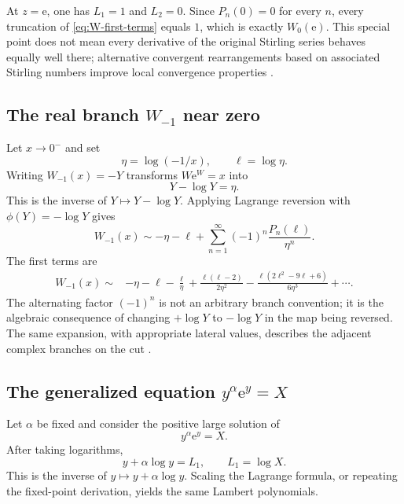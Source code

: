 \documentclass[11pt]{article}
\theoremstyle{pltheorem}
\newcommand{\e}{\mathrm e}
\begin{document}
At \(z=\e\), one has \(L_1=1\) and \(L_2=0\).  Since
\(P_n(0)=0\) for every \(n\), every truncation of
\cref{eq:W-first-terms} equals \(1\), which is exactly
\(W_0(\e)\).  This special point does not mean every derivative of the original Stirling series behaves equally well there; alternative convergent rearrangements based on associated Stirling numbers improve local convergence properties \cite{jeffrey-et-al-1995}.

\subsection{\texorpdfstring{The real branch \(W_{-1}\) near zero}{The real branch W-1 near zero}}

Let \(x\to0^-\) and set
\begin{equation}\label{eq:eta-def}
 \eta=\log(-1/x),
 \qquad
 \ell=\log\eta.
\end{equation}
Writing \(W_{-1}(x)=-Y\) transforms
\(W\e^W=x\) into
\begin{equation}\label{eq:Y-minus-logY}
 Y-\log Y=\eta.
\end{equation}
This is the inverse of \(Y\mapsto Y-\log Y\).  Applying Lagrange reversion with \(\phi(Y)=-\log Y\) gives
\begin{equation}\label{eq:Wminus1-expansion}
 \boxed{\quad
 W_{-1}(x)\sim-\eta-\ell
 +\sum_{n=1}^{\infty}(-1)^n\frac{P_n(\ell)}{\eta^n}.
 \quad}
\end{equation}
The first terms are
\begin{align}
 W_{-1}(x)\sim{}&-\eta-\ell-\frac{\ell}{\eta}
 +\frac{\ell(\ell-2)}{2\eta^2}
 -\frac{\ell(2\ell^2-9\ell+6)}{6\eta^3}
 +\cdots.
 \label{eq:Wminus1-first}
\end{align}
The alternating factor \((-1)^n\) is not an arbitrary branch convention; it is the algebraic consequence of changing \(+\log Y\) to \(-\log Y\) in the map being reversed.  The same expansion, with appropriate lateral values, describes the adjacent complex branches on the cut \cite{dlmf-W,corless-et-al-1996}.

\subsection{\texorpdfstring{The generalized equation \(y^\alpha\e^y=X\)}{The generalized equation y to the alpha times exp(y) = X}}

Let \(\alpha\) be fixed and consider the positive large solution of
\begin{equation}\label{eq:generalized-Lambert}
 y^\alpha\e^y=X.
\end{equation}
After taking logarithms,
\begin{equation}\label{eq:generalized-log-equation}
 y+\alpha\log y=L_1,
 \qquad
 L_1=\log X.
\end{equation}
This is the inverse of \(y\mapsto y+\alpha\log y\).  Scaling the Lagrange formula, or repeating the fixed-point derivation, yields the same Lambert polynomials.
\end{document}
